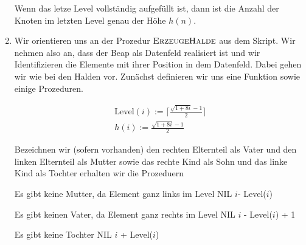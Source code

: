 \begin{solution}
\begin{enumerate}[label = \alph*)]
	Wenn das letze Level vollständig aufgefüllt ist, dann ist die Anzahl der Knoten im letzten Level genau der Höhe $h(n)$. 


  \item Wir orientieren uns an der Prozedur $\textsc{ErzeugeHalde}$ aus dem Skript. Wir nehmen also an, dass der Beap als Datenfeld realisiert ist und wir Identifizieren die Elemente mit ihrer Position in dem Datenfeld. Dabei gehen wir wie bei den Halden vor. Zunächst definieren wir uns eine Funktion sowie einige Prozeduren.

  \begin{align*}
    \mathrm{Level}(i) := \Big\lceil \frac{\sqrt{1 + 8i} - 1}{2}\Big\rceil \\
    h(i) := \frac{\sqrt{1 + 8i} - 1}{2}
  \end{align*}

  Bezeichnen wir (sofern vorhanden) den rechten Elternteil als Vater und den linken Elternteil als Mutter sowie das rechte Kind als Sohn und das linke Kind als Tochter erhalten wir die Prozeduern



    \begin{algorithmic}[1]
            \Comment Es gibt keine Mutter, da Element ganz links im Level
                \State \Return NIL
            \Else
                \State \Return $i$- Level($i$)
            \EndIf
        \EndProcedure
    \end{algorithmic}

\phantom{}

    \begin{algorithmic}[1]
            \Comment Es gibt keinen Vater, da Element ganz rechts im Level
                \State \Return NIL
            \Else
                \State \Return $i$ - Level($i$) + 1
            \EndIf
        \EndProcedure
    \end{algorithmic}

\phantom{}

    \begin{algorithmic}[1]
            \Comment Es gibt keine Tochter
                \State \Return NIL
            \Else
                \State \Return $i$ + Level($i$)
            \EndIf
        \EndProcedure
    \end{algorithmic}


\end{enumerate}
\end{solution}

